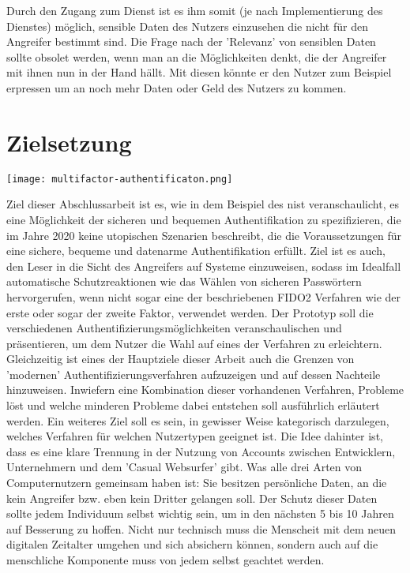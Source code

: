 Durch den Zugang zum Dienst ist es ihm somit (je nach Implementierung des Dienstes) möglich, sensible Daten des Nutzers einzusehen die nicht für den Angreifer bestimmt sind. Die Frage nach der 'Relevanz' von sensiblen Daten sollte obsolet werden, wenn man an die Möglichkeiten denkt, die der Angreifer mit ihnen nun in der Hand hällt. Mit diesen könnte er den Nutzer zum Beispiel erpressen um an noch mehr Daten oder Geld des Nutzers zu kommen.

\section{Zielsetzung}
\texttt{[image: multifactor-authentificaton.png]}

Ziel dieser Abschlussarbeit ist es, wie in dem Beispiel des \ac{nist} veranschaulicht, es eine Möglichkeit der sicheren und bequemen Authentifikation zu spezifizieren, die im Jahre 2020 keine utopischen Szenarien beschreibt, die die Voraussetzungen für eine sichere, bequeme und datenarme Authentifikation erfüllt. Ziel ist es auch, den Leser in die Sicht des Angreifers auf Systeme einzuweisen, sodass im Idealfall automatische Schutzreaktionen wie das Wählen von sicheren Passwörtern hervorgerufen, wenn nicht sogar eine der beschriebenen FIDO2 Verfahren wie der erste oder sogar der zweite Faktor, verwendet werden. Der Prototyp soll die verschiedenen Authentifizierungsmöglichkeiten veranschaulischen und präsentieren, um dem Nutzer die Wahl auf eines der Verfahren zu erleichtern. Gleichzeitig ist eines der Hauptziele dieser Arbeit auch die Grenzen von 'modernen' Authentifizierungsverfahren aufzuzeigen und auf dessen Nachteile hinzuweisen. Inwiefern eine Kombination dieser vorhandenen Verfahren, Probleme löst und welche minderen Probleme dabei entstehen soll ausführlich erläutert werden. Ein weiteres Ziel soll es sein, in gewisser Weise kategorisch darzulegen, welches Verfahren für welchen Nutzertypen geeignet ist. Die Idee dahinter ist, dass es eine klare Trennung in der Nutzung von Accounts zwischen Entwicklern, Unternehmern und dem 'Casual Websurfer' gibt. Was alle drei Arten von Computernutzern gemeinsam haben ist: Sie besitzen persönliche Daten, an die kein Angreifer bzw. eben kein Dritter gelangen soll. Der Schutz dieser Daten sollte jedem Individuum selbst wichtig sein, um in den nächsten 5 bis 10 Jahren auf Besserung zu hoffen. Nicht nur technisch muss die Menscheit mit dem neuen digitalen Zeitalter umgehen und sich absichern können, sondern auch auf die menschliche Komponente muss von jedem selbst geachtet werden.

